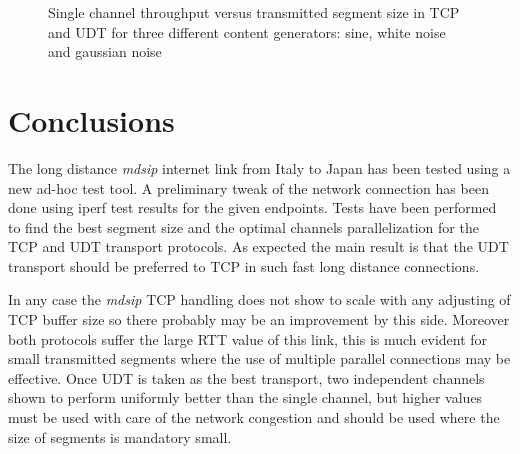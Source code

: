 \documentclass[10pt,a4paper]{article}
\begin{document}
\begin{figure}[ht]
\centerline{
}
\caption[]
{ Single channel throughput versus transmitted segment size in TCP and UDT for three different content generators: sine, white noise and gaussian noise }
\label{fig:content}
\end{figure}



\section{Conclusions}

The long distance \emph{mdsip} internet link from Italy to Japan has been tested using a new ad-hoc test tool.
A preliminary tweak of the network connection has been done using iperf test results for the given endpoints.
Tests have been performed to find the best segment size and the optimal channels parallelization for the TCP and UDT transport protocols.
As expected the main result is that the UDT transport should be preferred to TCP in such fast long distance connections.

In any case the \emph{mdsip} TCP handling does not show to scale with any adjusting of TCP buffer size so there probably may be an improvement by this side.
Moreover both protocols suffer the large RTT value of this link, this is much evident for small transmitted segments where the use of multiple parallel connections may be effective.
Once UDT is taken as the best transport, two independent channels shown to perform uniformly better than the single channel, but higher values must be used with care of the network congestion and should be used where the size of segments is mandatory small.
\end{document}
